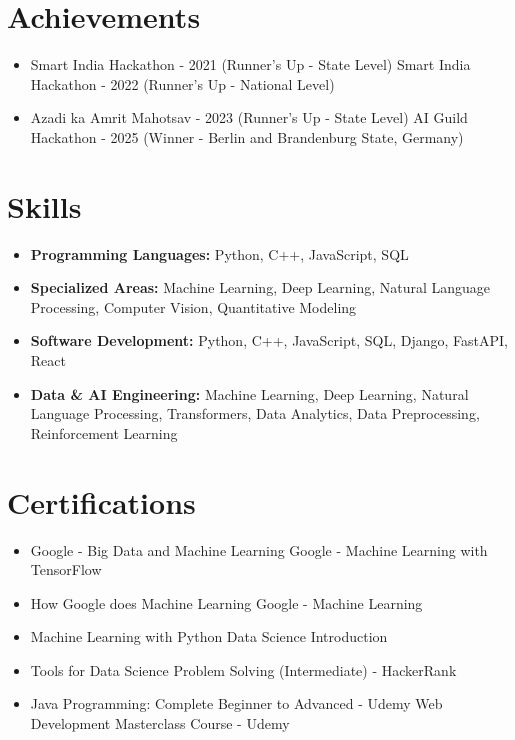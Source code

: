 \documentclass[a4paper,10pt]{article}
\begin{document}
\section*{Achievements}
\begin{itemize}
\item Smart India Hackathon - 2021 (Runner's Up - State Level) \hfill Smart India Hackathon - 2022 (Runner's Up - National Level)
\item Azadi ka Amrit Mahotsav - 2023 (Runner's Up - State Level) \hfill AI Guild Hackathon - 2025 (Winner - Berlin and Brandenburg State, Germany)
\end{itemize}

\section*{Skills}
\begin{itemize}
  \item \textbf{Programming Languages:} Python, C++, JavaScript, SQL
  \item \textbf{Specialized Areas:} Machine Learning, Deep Learning, Natural Language Processing, Computer Vision, Quantitative Modeling
  \item \textbf{Software Development:} Python, C++, JavaScript, SQL, Django, FastAPI, React
  \item \textbf{Data \& AI Engineering:} Machine Learning, Deep Learning, Natural Language Processing, Transformers, Data Analytics, Data Preprocessing, Reinforcement Learning
\end{itemize}

\section*{Certifications}
\begin{itemize}
\item Google - Big Data and Machine Learning \hfill Google - Machine Learning with TensorFlow
\item How Google does Machine Learning \hfill Google - Machine Learning
\item Machine Learning with Python \hfill Data Science Introduction
\item Tools for Data Science \hfill Problem Solving (Intermediate) - HackerRank
\item Java Programming: Complete Beginner to Advanced - Udemy \hfill Web Development Masterclass Course - Udemy
\end{itemize}
\end{document}
